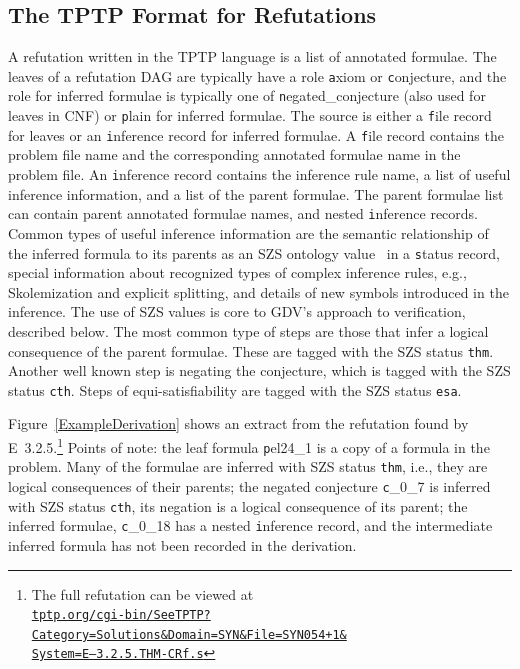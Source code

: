 \documentclass[runningheads]{llncs}
\newcommand{\smalltt}[1]{\small \texttt{#1}}
\begin{document}
\subsection{The TPTP Format for Refutations}
\label{Derivations}

A refutation written in the TPTP language is a list of annotated formulae. 
The leaves of a refutation DAG are typically have a role {\smalltt axiom} or {\smalltt conjecture}, 
and the role for inferred formulae is typically one of {\smalltt negated\_conjecture} (also used 
for leaves in CNF) or {\smalltt plain} for inferred formulae. 
The source is either a {\smalltt file} record for leaves or an {\smalltt inference} record for 
inferred formulae.
A {\smalltt file} record contains the problem file name and the corresponding annotated formulae 
name in the problem file.
An {\smalltt inference} record contains the inference rule name, a list of useful inference 
information, and a list of the parent formulae.
The parent formulae list can contain parent annotated formulae names, and nested 
{\smalltt inference} records.
Common types of useful inference information are the semantic relationship of the inferred formula 
to its parents as an SZS ontology value~\cite{Sut08-KEAPPA} in a {\smalltt status} record, 
special information about recognized types of complex inference rules, e.g., Skolemization and
explicit splitting, and details of new symbols introduced in the inference.
The use of SZS values is core to GDV's approach to verification, described below.
The most common type of steps are those that infer a logical consequence of the parent formulae.
These are tagged with the SZS status {\smalltt{thm}}.
Another well known step is negating the conjecture, which is tagged with the SZS status 
{\smalltt{cth}}.
Steps of equi-satisfiability are tagged with the SZS status {\smalltt{esa}}. 

Figure~\ref{ExampleDerivation} shows an extract from the refutation found by E~3.2.5.\footnote{%
The full refutation can be viewed at \\ \href{https://tptp.org/cgi-bin/SeeTPTP?Category=Solutions\&Domain=SYN\&File=SYN054+1\&System=E---3.2.5.THM-CRf.s}{{\tt tptp.org/cgi-bin/SeeTPTP?Category=Solutions\&Domain=SYN\&File=SYN054+1\& \\ System=E---3.2.5.THM-CRf.s}}}
Points of note:
the leaf formula {\smalltt pel24\_1} is a copy of a formula in the problem.
Many of the formulae are inferred with SZS status {\smalltt{thm}}, i.e., they are logical 
consequences of their parents;
the negated conjecture {\smalltt c\_0\_7} is inferred with SZS status {\smalltt{cth}},
its negation is a logical consequence of its parent;
the inferred formulae, {\smalltt c\_0\_18} has a nested {\smalltt inference} record, and the 
intermediate inferred formula has not been recorded in the derivation. 
\end{document}
